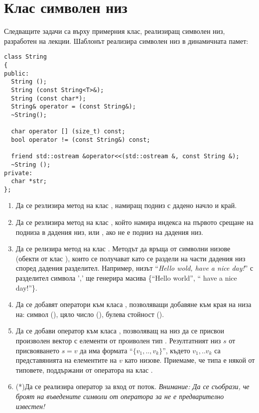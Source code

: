 \pagebreak

\clearpage\section{Клас символен низ}

\begin{mdframed}[hidealllines=true,backgroundcolor=gray!20]
Следващите задачи са върху примерния клас, реализиращ символен низ, разработен на лекции. Шаблонът реализира символен низ в динамичната памет:
\begin{verbatim}
class String
{
public:
  String ();
  String (const String<T>&);
  String (const char*);
  String& operator = (const String&);
  ~String();

  char operator [] (size_t) const;
  bool operator != (const String&) const;

  friend std::ostream &operator<<(std::ostream &, const String &);
  ~String ();
private:
  char *str;
};

\end{verbatim}
\end{mdframed}

\begin{enumerate}
  \item Да се резлизира метод  на клас , намиращ подниз с дадено начло и край.
  \item Да се резлизира метод  на клас , който намира индекса на първото срещане на подниза  в дадения низ, или , ако  не е подниз на дадения низ.
  \item Да се релизира метод  на клас . Методът да връща  от символни низове (обекти от клас ), които се получават като се раздели на части дадения низ според дадения разделител. Например, низът ``\emph{Hello wold, have a nice day!}'' с разделител символа ',' ще генерира масива \{``Hello world'', `` have a nice day!''\}.
  \item Да се добавят оператори \code{+=} към класа , позволяващи добавяне към края на низа на: символ (), цяло число (), булева стойност ().
  \item Да се добави оператор \code{=} към класа , позволяващ на низ да се присвои произволен вектор с елементи от проиволен тип . Резултатният низ $s$ от присвояването $s=v$ да има формата ``$\{v_1,..,v_k\}$'', където $v_1,..v_k$ са представянията на елементите на $v$ като низове. Приемаме, че типа  е някой от типовете, поддържани от оператора \code{+=} на клас .
  \item (*)Да се реализира оператор за вход от поток. \emph{Внимание: Да се съобрази, че броят на въведените символи от оператора  \code{>{}>} за  не е предварително известен!}

\end{enumerate}


